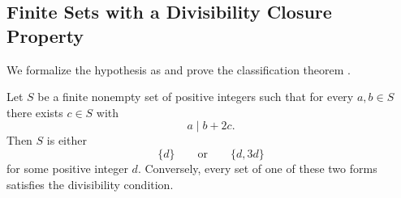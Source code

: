 
\subsection{Finite Sets with a Divisibility Closure Property}

We formalize the hypothesis as
 and prove the classification
theorem
.

\begin{theorem}
Let \(S\) be a finite nonempty set of positive integers such that for every
\(a,b \in S\) there exists \(c \in S\) with
\[
  a \mid b + 2c.
\]
Then \(S\) is either
\[
  \{d\}
  \qquad\text{or}\qquad
  \{d,3d\}
\]
for some positive integer \(d\). Conversely, every set of one of these two
forms satisfies the divisibility condition.
\end{theorem}

